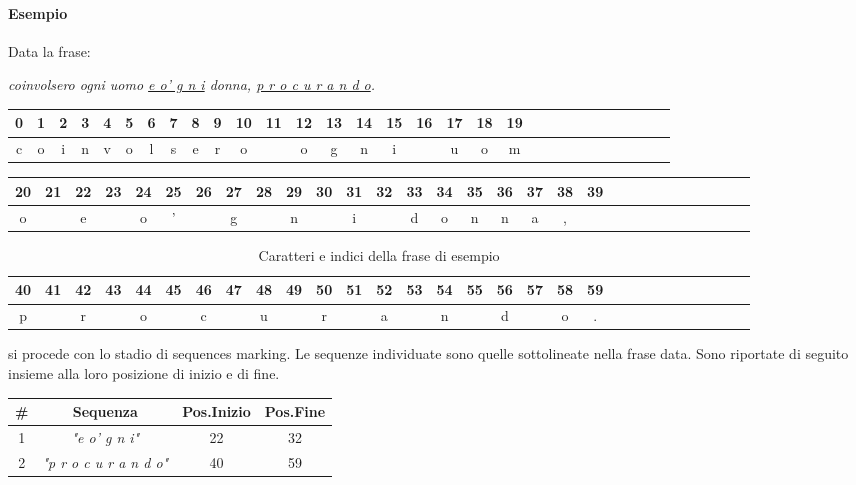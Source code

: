 
\paragraph{Esempio}
Data la frase:
\begin{center}
\textit{coinvolsero ogni uomo \ul{e o' g n i} donna, \ul{p r o c u r a n d o}.}
\end{center}


\begin{table}[H]
\centering
\tabcolsep=0.16cm
\begin{tabular}{|c|c|c|c|c|c|c|c|c|c|c|c|c|c|c|c|c|c|c|c|c|c|c|c|c|c|c|c|c|c|}
\hline
0&1&2&3&4&5&6&7&8&9&10&11&12&13&14&15&16&17&18&19\\
\hline
c&o&i&n&v&o&l&s&e&r&o& &o&g&n&i& &u&o&m\\
\hline
\end{tabular}
\end{table}
\begin{table}[H]
\centering
\tabcolsep=0.11cm
\begin{tabular}{|c|c|c|c|c|c|c|c|c|c|c|c|c|c|c|c|c|c|c|c|c|c|c|c|c|c|c|c|c|c|}
\hline
20&21&22&23&24&25&26&27&28&29&30&31&32&33&34&35&36&37&38&39\\
\hline
o& &e& &o&'& &g& &n& &i& &d&o&n&n&a&,&\\
\hline
\end{tabular}
\end{table}
\begin{table}[H]
\centering
\tabcolsep=0.11cm
\begin{tabular}{|c|c|c|c|c|c|c|c|c|c|c|c|c|c|c|c|c|c|c|c|c|c|c|c|c|c|c|c|c|c|}
\hline
40&41&42&43&44&45&46&47&48&49&50&51&52&53&54&55&56&57&58&59\\
\hline
p& &r& &o& &c& &u& &r& &a& &n& &d& &o&.\\
\hline
\end{tabular}
\caption{Caratteri e indici della frase di esempio}
\end{table}




si procede con lo stadio di sequences marking. Le sequenze individuate sono quelle sottolineate nella frase data. Sono riportate di seguito insieme alla loro posizione di inizio e di fine.
\begin{table}[H]
\centering
\begin{tabular}{cccc}
\#&\textbf{Sequenza} & \textbf{Pos.Inizio} & \textbf{Pos.Fine}\\ \hline
1&\textit{"e o' g n i"}&22& 32\\
2&\textit{"p r o c u r a n d o"}& 40& 59\\
\end{tabular}
\end{table}

